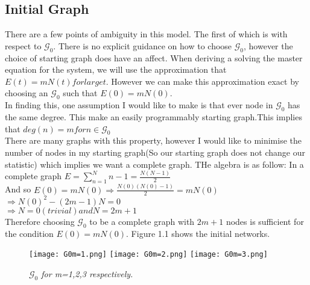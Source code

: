 \documentclass[]{article}
\begin{document}
\subsection{Initial Graph}
There are a few points of ambiguity in this model. The first of which is with respect to $\mathcal{G}_0$. There is no explicit guidance on how to choose $\mathcal{G}_0\!$, however the choice of starting graph does have an affect. When deriving a solving the master equation for the system, we will use the approximation that $E(t)=mN(t) \!for\! large\! t$. However we can make this approximation exact by choosing an $\mathcal{G}_0$ such that $E(0)=mN(0)$.\\
In finding this, one assumption I would like to make is that ever node in $\mathcal{G_0}$ has the same degree. This make an easily programmably starting graph.This implies that $deg(n)=m\! for\! n \in \mathcal{G_0}$\\
There are many graphs with this property, however I would like to minimise the number of nodes in my starting graph(So our starting graph does not change our statistic) which implies we want a complete graph. THe algebra is as follow:
In a complete graph $E=\sum_{n=1}^{N} n-1 = \frac{N(N-1)}{2}$\\
\vspace{0.2cm}
And so $E(0)=mN(0) \Rightarrow \frac{N(0)(N(0)-1)}{2}=mN(0)$\\
\vspace{0.2cm}
$\Rightarrow N(0)^2 - (2m -1)N = 0$\\
\vspace{0.2cm}
$\Rightarrow N=0 (trivial) and N=2m+1$\\
\vspace{0.2cm}
Therefore choosing $\mathcal{G}_0$ to be a complete graph with $2m+1$ nodes is sufficient for the condition $E(0)=mN(0)$. Figure 1.1 shows the initial networks. 
\begin{figure}[htp]
	\centering
	
	\texttt{[image: G0m=1.png]}\hfill
	\texttt{[image: G0m=2.png]}\hfill
	\texttt{[image: G0m=3.png]}
	\caption{\textit{$\mathcal{G}_0$ for m=1,2,3 respectively.}}
\end{figure}
\end{document}
